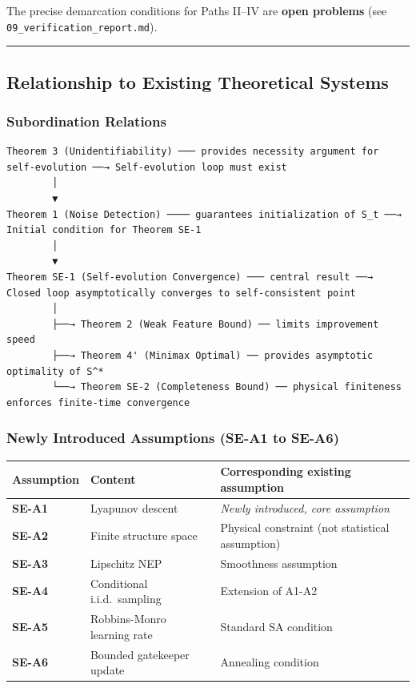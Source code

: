 \documentclass[
  12pt,
]{article}
\begin{document}
The precise demarcation conditions for Paths II--IV are \textbf{open problems} (see \texttt{09\_verification\_report.md}).

\begin{center}\rule{0.5\linewidth}{0.5pt}\end{center}

\subsection{Relationship to Existing Theoretical Systems}\label{relationship-to-existing-theoretical-systems}

\subsubsection{Subordination Relations}\label{subordination-relations}

\begin{verbatim}
Theorem 3 (Unidentifiability) ─── provides necessity argument for self-evolution ──→ Self-evolution loop must exist
        │
        ▼
Theorem 1 (Noise Detection) ──── guarantees initialization of S_t ──→ Initial condition for Theorem SE-1
        │
        ▼
Theorem SE-1 (Self-evolution Convergence) ─── central result ──→ Closed loop asymptotically converges to self-consistent point
        │
        ├──→ Theorem 2 (Weak Feature Bound) ── limits improvement speed
        ├──→ Theorem 4' (Minimax Optimal) ── provides asymptotic optimality of S^*
        └──→ Theorem SE-2 (Completeness Bound) ── physical finiteness enforces finite-time convergence
\end{verbatim}

\subsubsection{Newly Introduced Assumptions (SE-A1 to SE-A6)}\label{newly-introduced-assumptions-se-a1-to-se-a6}

\begin{longtable}[]{@{}lll@{}}
\toprule\noalign{}
Assumption & Content & Corresponding existing assumption \\
\midrule\noalign{}
\endhead
\bottomrule\noalign{}
\endlastfoot
\textbf{SE-A1} & Lyapunov descent & \emph{Newly introduced, core assumption} \\
\textbf{SE-A2} & Finite structure space & Physical constraint (not statistical assumption) \\
\textbf{SE-A3} & Lipschitz NEP & Smoothness assumption \\
\textbf{SE-A4} & Conditional i.i.d.\ sampling & Extension of A1-A2 \\
\textbf{SE-A5} & Robbins-Monro learning rate & Standard SA condition \\
\textbf{SE-A6} & Bounded gatekeeper update & Annealing condition \\
\end{longtable}
\end{document}
